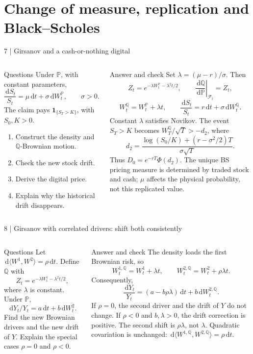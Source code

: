 \documentclass[handout,10pt,t,aspectratio=169]{beamer}
\newcommand{\Q}{\mathbb Q}
\newcommand{\Pp}{\mathbb P}
\newcommand{\F}{\mathcal F}
\newcommand{\dd}{\,\mathrm d}
\newcommand{\ind}{\mathbf1}
\newenvironment{questions}{\begin{block}{Questions}}{\end{block}}
\newenvironment{answers}{\begin{exampleblock}{Answer and check}}{\end{exampleblock}}
\newcommand{\compact}{\small%
 \setlength{\abovedisplayskip}{3pt}%
 \setlength{\belowdisplayskip}{3pt}%
 \setlength{\abovedisplayshortskip}{2pt}%
 \setlength{\belowdisplayshortskip}{2pt}%
 \setlength{\parskip}{2pt}}
\begin{document}
\section{Change of measure, replication and Black--Scholes}
\begin{frame}{7 | Girsanov and a cash-or-nothing digital}
\compact
\begin{columns}[T,onlytextwidth]
\begin{questions}
Under \(\Pp\), with constant parameters,
\[
 \frac{\dd S_t}{S_t}=\mu\dd t+\sigma\dd W_t^\Pp,
 \qquad \sigma>0.
\]
The claim pays \(\ind_{\{S_T>K\}}\), with \(S_0,K>0\).
\begin{enumerate}
\item Construct the density and \(\Q\)-Brownian motion.
\item Check the new stock drift.
\item Derive the digital price.
\item Explain why the historical drift disappears.
\end{enumerate}
\end{questions}
\begin{answers}
Set \(\lambda=(\mu-r)/\sigma\). Then
\[
 Z_t=e^{-\lambda W_t^\Pp-\lambda^2t/2},\qquad
 \left.\frac{\dd\Q}{\dd\Pp}\right|_{\F_t}=Z_t,
\]
\[
 W_t^\Q=W_t^\Pp+\lambda t,\qquad
 \frac{\dd S_t}{S_t}=r\dd t+\sigma\dd W_t^\Q.
\]
Constant \(\lambda\) satisfies Novikov. The event \(S_T>K\) becomes
\(W_T^\Q/\sqrt T>-d_2\), where
\[
 d_2=\frac{\log(S_0/K)+(r-\sigma^2/2)T}{\sigma\sqrt T}.
\]
Thus \(\boxed{D_0=e^{-rT}\Phi(d_2)}\).
The unique BS pricing measure is determined by traded stock and cash;
\(\mu\) affects the physical probability, not this replicated value.
\end{answers}
\end{columns}
\end{frame}

\begin{frame}{8 | Girsanov with correlated drivers: shift both consistently}
\compact
\begin{columns}[T,onlytextwidth]
\begin{questions}
Let \(\dd\langle W^1,W^2\rangle=\rho\dd t\).
Define \(\Q\) with
\[
 Z_t=e^{-\lambda W_t^1-\lambda^2t/2},
\]
where \(\lambda\) is constant. Under \(\Pp\),
\[
 \dd Y_t/Y_t=a\dd t+b\dd W_t^2.
\]
Find the new Brownian drivers and the new drift of \(Y\).
Explain the special cases \(\rho=0\) and \(\rho<0\).
\end{questions}
\begin{answers}
The density loads the first Brownian risk, so
\[
 W_t^{1,\Q}=W_t^1+\lambda t,\qquad
 W_t^{2,\Q}=W_t^2+\rho\lambda t.
\]
Consequently,
\[
 \frac{\dd Y_t}{Y_t}
 =(a-b\rho\lambda)\dd t+b\dd W_t^{2,\Q}.
\]
If \(\rho=0\), the second driver and the drift of \(Y\) do not change.
If \(\rho<0\) and \(b,\lambda>0\), the drift correction is positive.
The second shift is \(\rho\lambda\), not \(\lambda\).
Quadratic covariation is unchanged:
\(\dd\langle W^{1,\Q},W^{2,\Q}\rangle=\rho\dd t\).
\end{answers}
\end{columns}
\end{frame}
\end{document}
